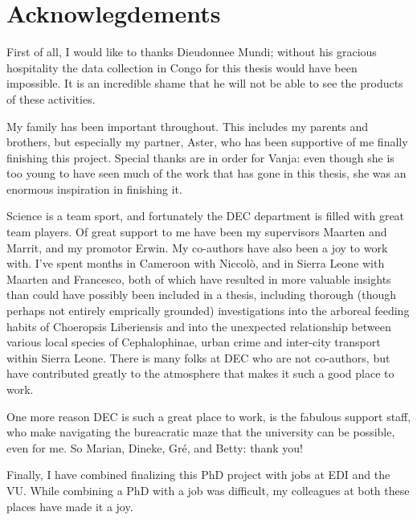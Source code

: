 \pagestyle{fancy}
\chapter*{Acknowlegdements}
First of all, I would like to thanks Dieudonnee Mundi; without his gracious hospitality the data collection in Congo for this thesis would have been impossible. It is an incredible shame that he will not be able to see the products of these activities.

My family has been important throughout. This includes my parents and brothers, but especially my partner, Aster, who has been supportive of me finally finishing this project. Special thanks are in order for Vanja: even though she is too young to have seen much of the work that has gone in this thesis, she was an enormous inspiration in finishing it.

Science is a team sport, and fortunately the DEC department is filled with great team players. Of great support to me have been my supervisors Maarten and Marrit, and my promotor Erwin. My co-authors have also been a joy to work with. I've spent months in Cameroon with Niccolò, and in Sierra Leone with Maarten and Francesco, both of which have resulted in more valuable insights than could have possibly been included in a thesis, including thorough (though perhaps not entirely emprically grounded) investigations into the arboreal feeding habits of Choeropsis Liberiensis and into the unexpected relationship between various local species of Cephalophinae, urban crime and inter-city transport within Sierra Leone. There is many folks at DEC who are not co-authors, but have contributed greatly to the atmosphere that makes it such a good place to work.

One more reason DEC is such a great place to work, is the fabulous support staff, who make navigating the bureacratic maze that the university can be possible, even for me. So Marian, Dineke, Gré, and Betty: thank you!

Finally, I have combined finalizing this PhD project with jobs at EDI and the VU. While combining a PhD with a job was difficult, my colleagues at both these places have made it a joy.





